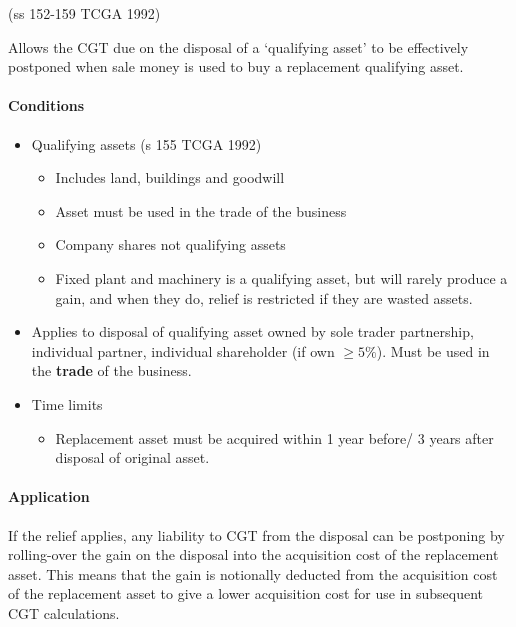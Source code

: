 \documentclass[
]{article}
\providecommand{\tightlist}{%
  \setlength{\itemsep}{0pt}\setlength{\parskip}{0pt}}
\begin{document}
(ss 152-159 TCGA 1992)

Allows the CGT due on the disposal of a `qualifying asset' to be
effectively postponed when sale money is used to buy a replacement
qualifying asset.

\hypertarget{conditions}{%
\paragraph{Conditions}\label{conditions}}

\begin{itemize}
\tightlist
\item
  Qualifying assets (s 155 TCGA 1992)

  \begin{itemize}
  \tightlist
  \item
    Includes land, buildings and goodwill
  \item
    Asset must be used in the trade of the business
  \item
    Company shares not qualifying assets
  \item
    Fixed plant and machinery is a qualifying asset, but will rarely
    produce a gain, and when they do, relief is restricted if they are
    wasted assets.
  \end{itemize}
\item
  Applies to disposal of qualifying asset owned by sole trader
  partnership, individual partner, individual shareholder (if own
  \(\geq 5\%\)). Must be used in the \textbf{trade} of the business.
\item
  Time limits

  \begin{itemize}
  \tightlist
  \item
    Replacement asset must be acquired within 1 year before/ 3 years
    after disposal of original asset.
  \end{itemize}
\end{itemize}

\hypertarget{application}{%
\paragraph{Application}\label{application}}

If the relief applies, any liability to CGT from the disposal can be
postponing by rolling-over the gain on the disposal into the acquisition
cost of the replacement asset. This means that the gain is notionally
deducted from the acquisition cost of the replacement asset to give a
lower acquisition cost for use in subsequent CGT calculations.
\end{document}
